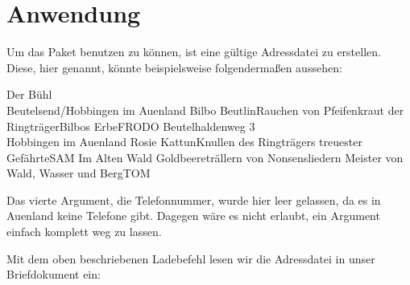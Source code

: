 \section{Anwendung}

\BeginIndexGroup
{}%
%
Um das Paket benutzen zu können, ist eine gültige
Adressdatei zu erstellen.
Diese, hier  genannt, könnte beispielsweise
folgendermaßen aussehen:
\begin{lstcode}
            {Der Bühl\\ Beutelsend/Hobbingen im Auenland}{}%
            {Bilbo Beutlin}{Rauchen von Pfeifenkraut}%
            {der Ringträger}{Bilbos Erbe}{FRODO}
           {Beutelhaldenweg 3\\Hobbingen im Auenland}{}%
           {Rosie Kattun}{Knullen}%
           {des Ringträgers treuester Gefährte}{SAM}
           {Im Alten Wald}{}%
           {Goldbeere}{trällern von Nonsensliedern}%
           {Meister von Wald, Wasser und Berg}{TOM}
\end{lstcode}
%
Das vierte Argument, die Telefonnummer, wurde hier leer gelassen, da es in
Auenland keine Telefone gibt. %
\iffalse %
Wie zu sehen ist, sind also auch leere Angaben möglich. Dagegen ist %
\else%
Dagegen wäre %
\fi%
es nicht erlaubt,\nopagebreak{} ein Argument einfach komplett weg zu lassen.

Mit dem oben beschriebenen Ladebefehl lesen wir die Adressdatei in unser
Briefdokument ein:
\begin{lstcode}
\end{lstcode}

